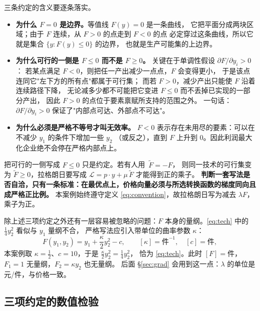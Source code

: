 三条约定的含义要逐条落实。

\begin{itemize}
  \item \textbf{为什么 $F=0$ 是边界。}等值线 $F(y)=0$ 是一条曲线，
        它把平面分成两块区域；由于 $F$ 连续，从 $F>0$ 的点走到 $F<0$ 的点
        必定穿过这条曲线，所以它就是集合 $\{y:F(y)\le 0\}$ 的边界，
        也就是生产可能集的上边界。
  \item \textbf{为什么可行的一侧是 $F\le 0$ 而不是 $F\ge 0$。}
        关键在于单调性假设 $\partial F/\partial y_i>0$：
        若某点满足 $F<0$，则把任一产出减少一点点，$F$ 会变得更小，
        于是该点连同它"左下方的所有点"都属于可行集；
        而若 $F>0$，减少产出只能使 $F$ 沿着连续路径下降，
        无论减多少都不可能把它变进 $F\le 0$ 而不丢掉已实现的一部分产出，
        因此 $F>0$ 的点位于要素禀赋所支持的范围之外。
        一句话：$\partial F/\partial y_i>0$ 保证了"内部点可达、外部点不可达"。
  \item \textbf{为什么必须是严格不等号才叫无效率。}
        $F<0$ 表示存在未用尽的要素：可以在不减少 $y_1$ 的条件下增加一些 $y_2$
        （或反之），直到 $F$ 上升到 $0$。因此利润最大化企业绝不会停在严格内部点上。
\end{itemize}

\begin{remark}
把可行的一侧写成 $F\le 0$ 只是约定。若有人用\ $\widetilde{F}=-F$，
则同一技术的可行集变为 $\widetilde{F}\ge 0$，拉格朗日要写成
$\mathcal{L}=p\cdot y+\mu\,\widetilde{F}$ 才能得到正的乘子。
\textbf{判断一套写法是否自洽，只有一条标准：在最优点上，价格向量必须与所选转换函数的梯度同向且成严格正比例。}
本案例始终遵守定义 \ref{eq:convention}，故拉格朗日写为减去 $\lambda F$，乘子为正。
\end{remark}

除上述三项约定之外还有一层容易被忽略的问题：$F$ 本身的量纲。\eqref{eq:tech} 中的 $\frac14 y_2^{2}$ 看似与 $y_1$ 量纲不合，
严格写法应引入带单位的曲率参数 $\kappa$：
\begin{equation}
F(y_1,y_2)=y_1+\frac{\kappa}{2}y_2^{2}-c,
\qquad [\kappa]=\text{件}^{-1},\quad [c]=\text{件},
\label{eq:tech-general}
\end{equation}
本案例取 $\kappa=\tfrac12$、$c=10$，于是 $\frac{\kappa}{2}y_2^{2}=\frac14 y_2^{2}$，
恰为 \eqref{eq:tech}。此时 $[F]=\text{件}$，
$F_1=1$ 无量纲，$F_2=\kappa y_2$ 也无量纲。
后面 \S\ref{sec:grad} 会用到这一点：$\lambda$ 的单位是元/件，与价格一致。

\subsection{三项约定的数值检验}


